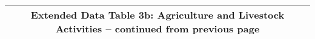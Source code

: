 \begin{longtable}{llcccccccccc}
\multicolumn{12}{c}{{\bfseries Extended Data Table 3b: Agriculture and Livestock Activities -- continued from previous page}} \\ \hline                                                                                                                                                                                                                                                                                                                                                                                                                                                                                                                                                                                                                                                                                                                                                                           

\end{longtable}

